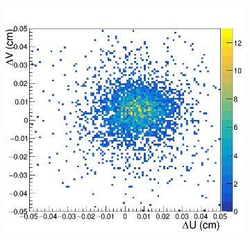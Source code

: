 \begin{figure}[h!]
\centering
 \begin{subfigure}[l]{.45\textwidth}
   \centering
   \includegraphics[width=\linewidth]{thesis_figures/alignment/Run_3211_after_prev/square/MX4.png}


\end{subfigure}
\end{figure}
